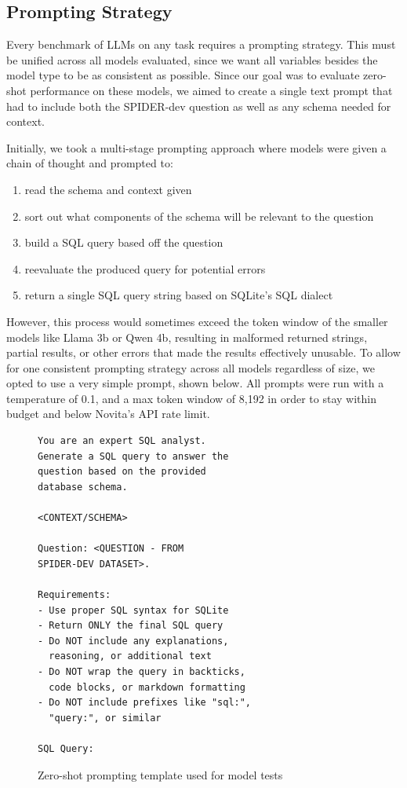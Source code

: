 \documentclass[sigconf]{acmart}
\begin{document}
\subsection*{Prompting Strategy}

Every benchmark of LLMs on any task requires a prompting strategy. This must be unified across all models evaluated, 
since we want all variables besides the model type to be as consistent as possible. Since our goal was to evaluate 
zero-shot performance on these models, we aimed to create a single text prompt that had to include both the SPIDER-dev
question as well as any schema needed for context.

Initially, we took a multi-stage prompting approach where models were given a chain of thought and prompted to:

\begin{enumerate}
  \item read the schema and context given
  \item sort out what components of the schema will be relevant to the question
  \item build a SQL query based off the question
  \item reevaluate the produced query for potential errors
  \item return a single SQL query string based on SQLite's SQL dialect
\end{enumerate}

However, this process would sometimes exceed the token window of the smaller models like Llama 3b or Qwen 4b, resulting
in malformed returned strings, partial results, or other errors that made the results effectively unusable. To allow
for one consistent prompting strategy across all models regardless of size, we opted to use a very simple prompt, shown
below. All prompts were run with a temperature of 0.1, and a max token window of 8,192 in order to stay within budget
and below Novita's API rate limit. 

\begin{figure}[H]
  \centering
  \begin{minipage}{\linewidth}
  \scriptsize
\begin{verbatim}
You are an expert SQL analyst.
Generate a SQL query to answer the
question based on the provided
database schema.

<CONTEXT/SCHEMA>

Question: <QUESTION - FROM
SPIDER-DEV DATASET>.

Requirements:
- Use proper SQL syntax for SQLite
- Return ONLY the final SQL query
- Do NOT include any explanations,
  reasoning, or additional text
- Do NOT wrap the query in backticks,
  code blocks, or markdown formatting
- Do NOT include prefixes like "sql:",
  "query:", or similar

SQL Query:
\end{verbatim}
\end{minipage}
\caption{Zero-shot prompting template used for model tests}
\label{fig:prompt}
\end{figure}
\end{document}

